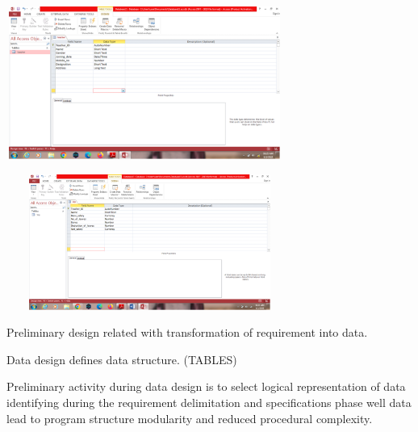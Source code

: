 \documentclass{article} %
\begin{document}
\noindent \underbar{}

\noindent \textbf{}

\noindent \textbf{\underbar{}}

\noindent \includegraphics*[width=3.56in, height=1.97in, keepaspectratio=false, trim=1.94in 4.20in 7.30in 1.35in]{image3}\underbar{}

\noindent \underbar{}

\noindent \textbf{}

\noindent \textbf{\underbar{}}

\noindent \includegraphics*[width=3.69in, height=1.75in, keepaspectratio=false, trim=2.10in 4.11in 7.59in 1.34in]{image4}\underbar{}

\noindent \underbar{}

\noindent \textbf{}

\noindent \textbf{\underbar{ }}\underbar{}

\noindent Preliminary design related with transformation of requirement into data. 

\noindent Data design defines data structure. (TABLES) 

\noindent \textbf{}

\noindent \underbar{}

\noindent Preliminary activity during data design is to select logical representation of data identifying during the requirement delimitation and specifications phase well data lead to program structure modularity and reduced procedural complexity. 
\end{document}
